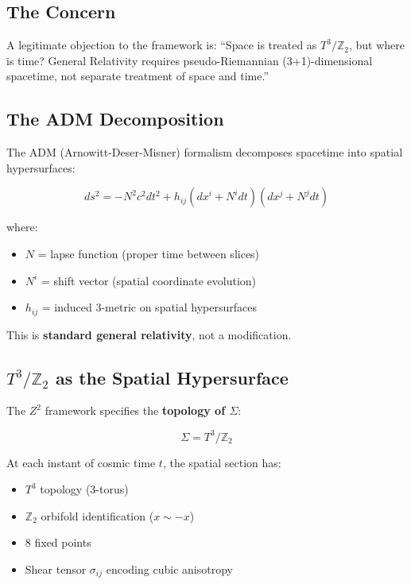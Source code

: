 \documentclass[12pt,a4paper]{article}
\newcommand{\Ztwo}{\mathbb{Z}_2}
\newcommand{\Tthree}{T^3}
\newcommand{\Zsq}{Z^2}
\begin{document}
\subsection{The Concern}

A legitimate objection to the framework is: ``Space is treated as $\Tthree/\Ztwo$, but where is time? General Relativity requires pseudo-Riemannian (3+1)-dimensional spacetime, not separate treatment of space and time.''

\subsection{The ADM Decomposition}

The ADM (Arnowitt-Deser-Misner) formalism decomposes spacetime into spatial hypersurfaces:

\begin{equation}
ds^2 = -N^2 c^2 dt^2 + h_{ij}(dx^i + N^i dt)(dx^j + N^j dt)
\end{equation}

where:
\begin{itemize}
    \item $N$ = lapse function (proper time between slices)
    \item $N^i$ = shift vector (spatial coordinate evolution)
    \item $h_{ij}$ = induced 3-metric on spatial hypersurfaces
\end{itemize}

This is \textbf{standard general relativity}, not a modification.

\subsection{$\Tthree/\Ztwo$ as the Spatial Hypersurface}

The $\Zsq$ framework specifies the \textbf{topology of $\Sigma$}:

\begin{equation}
\Sigma = \Tthree/\Ztwo
\end{equation}

At each instant of cosmic time $t$, the spatial section has:
\begin{itemize}
    \item $\Tthree$ topology (3-torus)
    \item $\Ztwo$ orbifold identification ($x \sim -x$)
    \item 8 fixed points
    \item Shear tensor $\sigma_{ij}$ encoding cubic anisotropy
\end{itemize}
\end{document}
